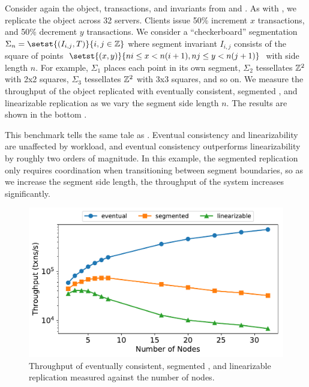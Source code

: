 \begin{benchmark}
  Consider again the object, transactions, and invariants from 
  and . As with , we replicate
  the object across 32 servers. Clients issue 50\% increment $x$ transactions,
  and 50\% decrement $y$ transactions. We consider a ``checkerboard''
  segmentation $\Sigma_n = \setst{(I_{i, j}, T)}{i, j \in \ints}$ where segment
  invariant $I_{i, j}$ consists of the square of points $\setst{(x, y)}{ni \leq
  x < n(i + 1), nj \leq y < n(j + 1)}$ with side length $n$. For example,
  $\Sigma_1$ places each point in its own segment, $\Sigma_2$ tessellates
  $\mathbb{Z}^2$ with 2x2 squares, $\Sigma_3$ tessellates $\mathbb{Z}^2$ with 3x3
  squares, and so on. We measure the throughput of the object replicated with
  eventually consistent, segmented \invariantconfluent{}, and linearizable
  replication as we vary the segment side length $n$. The results are shown in
  the bottom .

  This benchmark tells the same tale as . Eventual
  consistency and linearizability are unaffected by workload, and eventual
  consistency outperforms linearizability by roughly two orders of magnitude.
  In this example, the segmented \invariantconfluent{} replication only requires
  coordination when transitioning between segment boundaries, so as we increase
  the segment side length, the throughput of the system increases
  significantly.
\end{benchmark}

\begin{figure}[ht]
  \centering
  \includegraphics[width=\columnwidth]{figures/vary_nodes.pdf}
  \caption{%
    Throughput of eventually consistent, segmented \invariantconfluent{}, and
    linearizable replication measured against the number of
    nodes.
  }
\end{figure}

